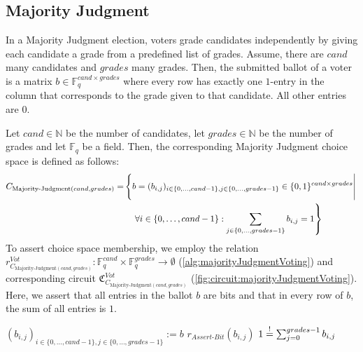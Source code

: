 \cleardoublepage
\subsection{Majority Judgment}
In a Majority Judgment election, voters grade candidates independently by giving each candidate a grade from a predefined list of grades.
Assume, there are $cand$ many candidates and $grades$ many grades. 
Then, the submitted ballot of a voter is a matrix $b\in\mathbb{F}_q^{cand\times grades}$ where every row has exactly one $1$-entry in the column that corresponds to the grade given to that candidate.
All other entries are $0$.

\begin{definition}
    Let $cand\in\mathbb{N}$ be the number of candidates, let $grades\in\mathbb{N}$ be the number of grades and let $\mathbb{F}_q$ be a field.
    Then, the corresponding Majority Judgment choice space is defined as follows:
    {\setlength{\mathindent}{2pt}
    \begin{align*}
        C_{\text{Majority-Judgment}(cand, grades)}=& \left\{b=(b_{i,j})_{i\in\{0,\dots, cand-1\}, j\in\{0,\dots, grades-1\}}\in \{0,1\}^{cand\times grades}\Bigg| \right.\\
        &\quad\left.\vphantom{\Bigg|}\forall i\in\{0,\dots, cand-1\}: \sum_{j\in\{0,\dots, grades-1\}} b_{i,j}=1\right\}\\
    \end{align*}
    }
    To assert choice space membership, we employ the relation $r_{C_{\text{Majority-Judgment}(cand, grades)}}^{Vot}:\mathbb{F}_q^{cand}\times\mathbb{F}_q^{grades}\to\emptyset$ (\cref{alg:majorityJudgmentVoting}) and corresponding circuit $\mathfrak{C}_{C_{\text{Majority-Judgment}(cand, grades)}}^{Vot}$ (\cref{fig:circuit:majorityJudgmentVoting}).\\
    Here, we assert that all entries in the ballot $b$ are bits and that in every row of $b$, the sum of all entries is $1$.
\end{definition}

\begin{Algorithmus}[h] %
    \caption{Function $r_{C_{\text{Majority-Judgment}(cand, grades)}}^{Vot}$ used to assert that a ballot $b\in\mathbb{F}_q^{cand\times grades}$ is part of the choice space $C_{\text{Majority-Judgment}(cand, grades)}$.
    Here, we use $r_{Assert\text{-}Bit}$ as an auxiliary function.
    }
    \label{alg:majorityJudgmentVoting}
    \begin{algorithmic}
        \State $(b_{i,j})_{i\in\{0,\dots, cand-1\}, j\in\{0,\dots, grades-1\}}:=b$
                \State $r_{Assert\text{-}Bit}(b_{i,j})$
            \EndFor
            \State $1\overset{!}{=} \sum_{j=0}^{grades-1} b_{i,j}$
        \EndFor
    \EndProcedure
    \end{algorithmic}
\end{Algorithmus}

